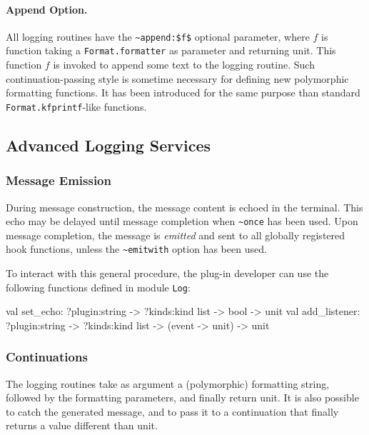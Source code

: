 \paragraph{Append Option.} All logging routines have the
\lstinline{~append:$f$} optional parameter, where $f$ is function
taking a \lstinline{Format.formatter} as parameter and returning
unit. This function $f$ is invoked to append some text to the logging
routine. Such continuation-passing style is sometime necessary for
defining new polymorphic formatting functions. It has been introduced
for the same purpose than standard \lstinline{Format.kfprintf}-like
functions.

\subsection{Advanced Logging Services}

\subsubsection{Message Emission}
\label{adv:log:events}

During message construction, the message content is echoed in the
terminal. This echo may be delayed until message completion when
\lstinline{~once} has been used. Upon message
completion, the message is \emph{emitted} and sent to all globally
registered hook functions, unless the
\lstinline{~emitwith} option has been used.

To interact with this general procedure, the plug-in developer can use
the following functions defined in module \texttt{Log}:

\begin{ocamlcode}
val set_echo:     ?plugin:string -> ?kinds:kind list -> bool -> unit
val add_listener: ?plugin:string -> ?kinds:kind list -> (event -> unit) -> unit
\end{ocamlcode}

\subsubsection{Continuations}

The logging routines take as argument a (polymorphic) formatting
string, followed by the formatting parameters, and finally return
unit. It is also possible to catch the generated message, and to pass
it to a continuation that finally returns a value different than unit.

